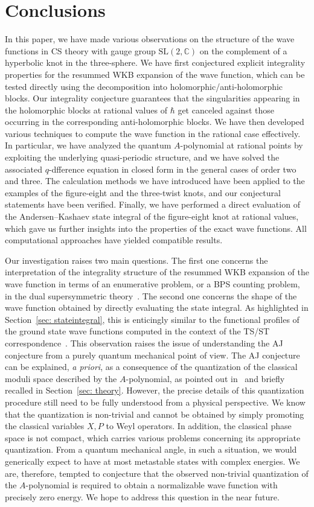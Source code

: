 \documentclass[a4paper,11pt]{article}
\theoremstyle{definition}
\def\IC{{\mathbb C}}
\newcommand{\sectiono}[1]{\section{#1}\setcounter{equation}{0}}
\begin{document}
\sectiono{Conclusions}\label{sec-conclusions}
In this paper, we have made various observations on the structure of the wave functions in CS theory with gauge group $\text{SL}(2,\IC)$ on the complement of a hyperbolic knot in the three-sphere. 
We have first conjectured explicit integrality properties for the resummed WKB expansion of the wave function, which can be tested directly using the decomposition into holomorphic/anti-holomorphic blocks. 
Our integrality conjecture guarantees that the singularities appearing in the holomorphic blocks at rational values of $\hbar$ get canceled against those occurring in the corresponding anti-holomorphic blocks. 
We have then developed various techniques to compute the wave function in the rational case effectively. In particular, we have analyzed the quantum $A$-polynomial at rational points by exploiting the underlying quasi-periodic structure, and we have solved the associated $q$-dfference equation in closed form in the general cases of order two and three. 
The calculation methods we have introduced have been applied to the examples of the figure-eight and the three-twist knots, and our conjectural statements have been verified.
Finally, we have performed a direct evaluation of the Andersen--Kashaev state integral of the figure-eight knot at rational values, which gave us further insights into the properties of the exact wave functions. All computational approaches have yielded compatible results.

Our investigation raises two main questions. The first one concerns the interpretation of the integrality structure of the resummed WKB expansion of the wave function in terms of an enumerative problem, or a BPS counting problem, in the dual supersymmetric theory~\cite{dgg}. The second one concerns the shape of the wave function obtained by directly evaluating the state integral. As highlighted in Section~\ref{sec: stateintegral}, this is enticingly similar to the functional profiles of the ground state wave functions computed in the context of the TS/ST correspondence~\cite{mz-wv, mz-wv2}. This observation raises the issue of understanding the AJ conjecture from a purely quantum mechanical point of view. 
The AJ conjecture can be explained, {\it a priori}, as a consequence of the quantization of the classical moduli space described by the $A$-polynomial, as pointed out in~\cite{gukov} and briefly recalled in Section~\ref{sec: theory}.
However, the precise details of this quantization procedure still need to be fully understood from a physical perspective. We know that the quantization is non-trivial and cannot be obtained by simply promoting the classical variables $X, P$ to Weyl operators. In addition, the classical phase space is not compact, which carries various problems concerning its appropriate quantization. From a quantum mechanical angle, in such a situation, we would generically expect to have at most metastable states with complex energies. We are, therefore, tempted to conjecture that the observed non-trivial quantization of the $A$-polynomial is required to obtain a normalizable wave function with precisely zero energy. We hope to address this question in the near future. 
\end{document}
